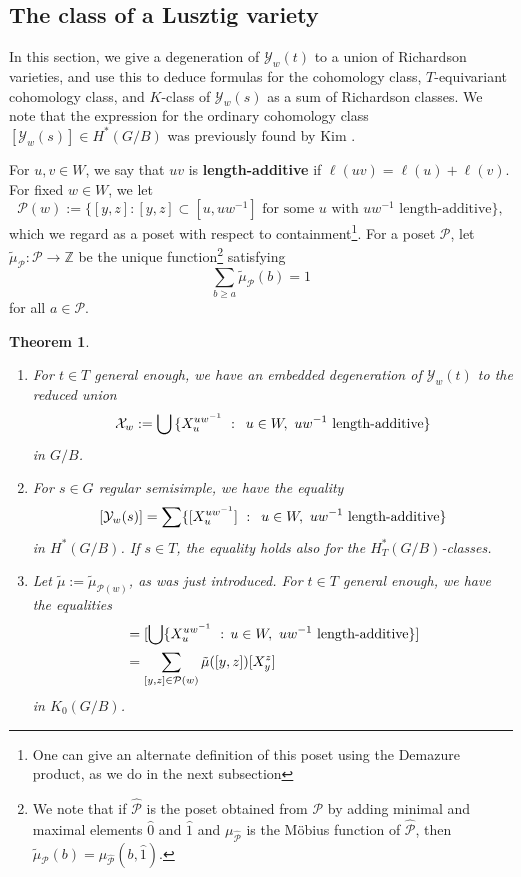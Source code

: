 \documentclass[10pt,a4paper]{amsart}
\newtheorem{theorem}[Thm]{Theorem}
\newcommand{\ZZ}{\mathbb{Z}}
\newcommand\defn[1]{{\bf #1}}
\def\calP{\mathcal{P}}
\def\calX{\mathcal{X}}
\def\mob{\tilde{\mu}}
\newcommand\calY{{\mathcal Y}}
\renewcommand{\colon}{\mathrel{:}}
\renewcommand{\colon}{:\mkern\thinmuskip}
\begin{document}
\subsection{The class of a Lusztig variety}\label{ssec:class-of-lusztig-var}

In this section, we give a degeneration of $\calY_w(t)$ to a union of
Richardson varieties, and use this to deduce formulas for the
cohomology class, $T$-equivariant cohomology class, and $K$-class of $\calY_w(s)$ as a
sum of Richardson classes. We note that the expression for the ordinary
cohomology class $[\calY_w(s)] \in H^*(G/B)$ was previously found by
Kim \cite[Theorem 4.12]{K20-deligne-lusztig}.

For $u, v \in W$, we say that $uv$ is \defn{length-additive} if $\ell(uv)=\ell(u) + \ell(v)$. 
For fixed $w \in W$, we let 
\[
  \calP(w):=\{[y, z]: [y,z] \subset [u, uw^{-1}] \text{ for some $u$ with $uw^{-1}$ length-additive}\},
\]
which we regard as a poset with respect to containment\footnote{One
  can give an alternate definition of this poset using the Demazure
  product, as we do in the next subsection}. For a poset $\calP$, let
$\mob_{\calP}: \calP \to \ZZ$ be the unique function\footnote{We note
  that if $\hat{\calP}$ is the poset obtained from $\calP$ by adding
  minimal and maximal elements $\hat{0}$ and $\hat{1}$ and
  $\mu_{\hat{\calP}}$ is the M\"obius function of $\hat{\calP}$, then
  $\mob_{\calP}(b) = \mu_{\hat{\calP}}(b, \hat{1})$.} satisfying
\[\sum_{b \geq a} \mob_{\calP}(b)=1\]
for all $a \in \calP$.  



\begin{theorem}\label{thm:Hclass}
  \begin{enumerate}
  \item   For $t \in T$ general enough, we have an embedded degeneration of
    $\calY_w(t)$ to the reduced union 
    \[\calX_w:=\bigcup\, \{  X_{u}^{uw^{-1}} \ \colon\
      u \in W, \  uw^{-1} ~\text{length-additive} \}     \]
    in $G/B$.
  \item  For $s \in G$ regular semisimple, we have the equality
    \[[\calY_w(s)] = \sum\{[X_{u}^{uw^{-1}}] \ \colon\
      u \in W, \  uw^{-1} ~\text{length-additive} \} \]
    in $H^*(G/B)$. If $s\in T$, the equality holds also for
    the $H^*_T(G/B)$-classes.
  \item Let $\mob:= \mob_{\calP(w)}$, as was just introduced. For $t \in T$ general enough, 
we have the equalities 
\begin{align*}[\calY_w(t)] &= [\bigcup \{X_{u}^{uw^{-1}}\ \colon 	u \in W, \  uw^{-1} ~\text{length-additive}\}]\\
		  &= \sum_{[y,z] \in \calP(w)} \mob([y,z]) [X_y^z]\end{align*}
		in $K_0(G/B)$. 
              \end{enumerate}
\end{theorem}
\end{document}
